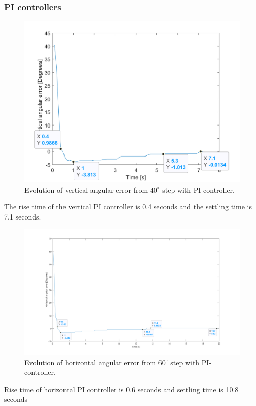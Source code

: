 \subsubsection{PI controllers}
\begin{figure}[H]
\centering
\includegraphics[width=\textwidth]{assets/Vertical_PI_controller.png}
\caption{Evolution of vertical angular error from \(40^{\circ}\) step with PI-controller.}
\label{vert_P}
\end{figure}
The rise time of the vertical PI controller is 0.4 seconds and the settling time is 7.1 seconds.
\begin{figure}[H]
\centering
\includegraphics[width=\textwidth]{assets/Horizontal_PI_controller.png}
\caption{Evolution of horizontal angular error from \(60^{\circ}\) step with PI-controller.}
\label{vert_P}
\end{figure}
Rise time of horizontal PI controller is 0.6 seconds and settling time is 10.8 seconds

